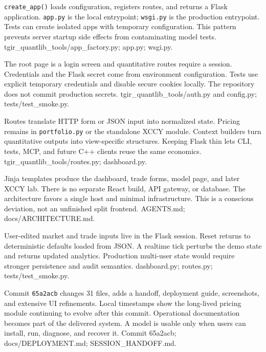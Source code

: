 
{\texttt{create\_app()} loads configuration, registers routes, and returns a Flask application.}
{\texttt{app.py} is the local entrypoint; \texttt{wsgi.py} is the production entrypoint.}
{Tests can create isolated apps with temporary configuration.}
{This pattern prevents server startup side effects from contaminating model tests.}
{tgir\_quantlib\_tools/app\_factory.py; app.py; wsgi.py.}

{The root page is a login screen and quantitative routes require a session.}
{Credentials and the Flask secret come from environment configuration.}
{Tests use explicit temporary credentials and disable secure cookies locally.}
{The repository does not commit production secrets.}
{tgir\_quantlib\_tools/auth.py and config.py; tests/test\_smoke.py.}

{Routes translate HTTP form or JSON input into normalized state.}
{Pricing remains in \texttt{portfolio.py} or the standalone XCCY module.}
{Context builders turn quantitative outputs into view-specific structures.}
{Keeping Flask thin lets CLI, tests, MCP, and future C++ clients reuse the same economics.}
{tgir\_quantlib\_tools/routes.py; dashboard.py.}

{Jinja templates produce the dashboard, trade forms, model page, and later XCCY lab.}
{There is no separate React build, API gateway, or database.}
{The architecture favors a single host and minimal infrastructure.}
{This is a conscious deviation, not an unfinished split frontend.}
{AGENTS.md; docs/ARCHITECTURE.md.}

{User-edited market and trade inputs live in the Flask session.}
{Reset returns to deterministic defaults loaded from JSON.}
{A realtime tick perturbs the demo state and returns updated analytics.}
{Production multi-user state would require stronger persistence and audit semantics.}
{dashboard.py; routes.py; tests/test\_smoke.py.}

{Commit \texttt{65a2acb} changes 31 files, adds a handoff, deployment guide, screenshots, and extensive UI refinements.}
{Local timestamps show the long-lived pricing module continuing to evolve after this commit.}
{Operational documentation becomes part of the delivered system.}
{A model is usable only when users can install, run, diagnose, and recover it.}
{Commit 65a2acb; docs/DEPLOYMENT.md; SESSION\_HANDOFF.md.}

